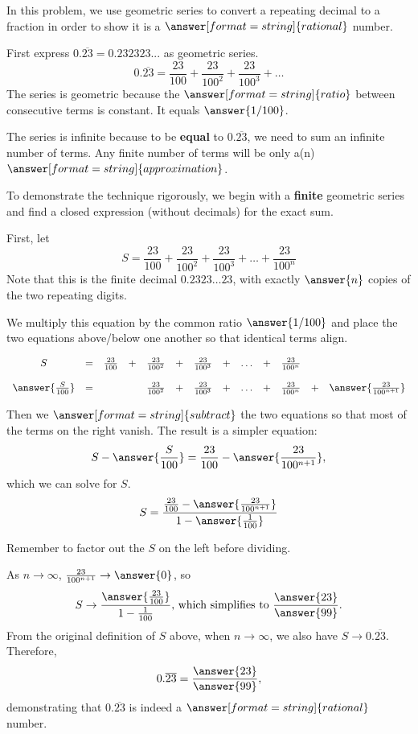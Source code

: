 \documentclass[nooutcomes]{ximera}
\begin{document}
\begin{problem}
In this problem, we use geometric series to convert a repeating decimal to a fraction in order to show it 
is a $\answer[format=string]{rational}$ number.  

First express $0.\overline{23}=0.232323...$ as geometric series.  
\[
0.\overline{23}=\frac{23}{100}+\frac{23}{100^2}+\frac{23}{100^3}+\dots
\]
The series is geometric because the $\answer[format=string]{ratio}$ between consecutive terms is constant.  It equals $\answer{1/100}$.  

The series is infinite because to be \textbf{equal} to $0.\overline{23}$, we need to sum an infinite number of terms.  Any finite number of terms will be only a(n) $\answer[format=string]{approximation}$.  

\begin{problem}
To demonstrate the technique rigorously, we begin with a \textbf{finite} geometric series and find a closed expression (without decimals) for the exact sum.  

First, let 
\[
S=\frac{23}{100}+\frac{23}{100^2}+\frac{23}{100^3}+\dots+\frac{23}{100^n}
\]
Note that this is the finite decimal $0.2323 \dots 23$, with exactly $\answer{n}$ copies of the two repeating digits.  

We multiply this equation by the common ratio $\answer{1/100}$ and place the two equations above/below one another so that identical terms align.  

\[
\begin{array}{ccccccccccccc}
                     S &=& \frac{23}{100} &+& \frac{23}{100^2} &+& \frac{23}{100^3} &+& \dots &+& \frac{23}{100^n} \\ \\
\answer{\frac{S}{100}} &=&                & & \frac{23}{100^2} &+& \frac{23}{100^3} &+& \dots &+& \frac{23}{100^n} 
         &+& \answer{\frac{23}{100^{n+1}}}
\end{array}
\]
\begin{problem}
Then we $\answer[format=string]{subtract}$ the two equations so that most of the terms on the right vanish.  The result is a simpler equation: 
\[
S - \answer{\frac{S}{100}} = \frac{23}{100} - \answer{\frac{23}{100^{n+1}}},
\]
which we can solve for $S$.  
\[
S = \frac{\frac{23}{100} - \answer{\frac{23}{100^{n+1}}}}{1-\answer{\frac{1}{100}}}
\]
\begin{hint}
Remember to factor out the $S$ on the left before dividing.  
\end{hint}
\begin{problem}
As $n\rightarrow\infty$, $\frac{23}{100^{n+1}} \rightarrow\answer{0}$, so 
\[
S \rightarrow \frac{\answer{\frac{23}{100}}}{1-\frac{1}{100}}\text{, which simplifies to }\frac{\answer{23}}{\answer{99}}.
\]
From the original definition of $S$ above, when $n\rightarrow\infty$, we also have $S\rightarrow 0.\overline{23}$.  Therefore, 
\[
0.\overline{23}=\frac{\answer{23}}{\answer{99}},
\]
demonstrating that $0.\overline{23}$ is indeed a $\answer[format=string]{rational}$ number.  
\end{problem}
\end{problem}
\end{problem}
\end{problem}
\end{document}
